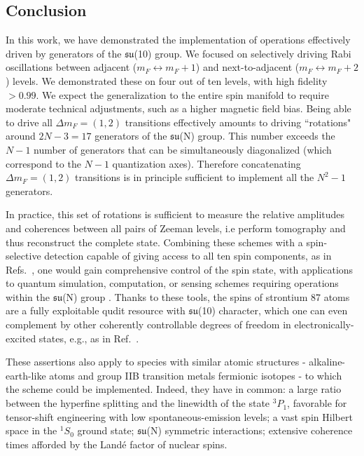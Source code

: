  
 
 \subsection{Conclusion}
 \label{Sec:Conclusion}

In this work, we have demonstrated the implementation of operations effectively driven by generators of the $\mathfrak{su}$(10) group. We focused on selectively driving Rabi oscillations between adjacent ($m_F \longleftrightarrow m_F+1$) and next-to-adjacent ($m_F \longleftrightarrow m_F+2$) levels. We demonstrated these on four out of ten levels, with high fidelity $>0.99$. We expect the generalization to the entire spin manifold to require moderate technical adjustments, such as a higher magnetic field bias. Being able to drive all $\Delta m_F = (1,2)$ transitions effectively amounts to driving ``rotations" around $2N-3 = 17$ generators of the $\mathfrak{su}$(N) group. This number exceeds the $N-1$ number of generators that can be simultaneously diagonalized (which  correspond to the $N-1$ quantization axes). Therefore concatenating $\Delta m_F = (1,2)$ transitions is in principle sufficient to implement all the $N^2-1$ generators. 

In practice, this set of rotations is sufficient to measure the relative amplitudes and coherences between all pairs of Zeeman levels, i.e perform tomography and thus reconstruct the complete state. Combining these schemes with a spin-selective detection capable of giving access to all ten spin components, as in Refs.~\cite{Stellmer2011dam, Taie2010roa}, one would gain comprehensive control of the spin state, with applications to quantum simulation, computation, or sensing schemes requiring operations within the $\mathfrak{su}$(N) group \cite{Kiktenko2015sqr, Omanakuttan2021, Godfrin2018gri, Randall2015epa, Lanyon2008sql}. Thanks to these tools, the spins of strontium 87 atoms are a fully exploitable qudit resource with $\mathfrak{su}$(10) character, which one can even complement by other coherently controllable degrees of freedom in electronically-excited states, e.g., as in Ref.~\cite{Pucher2024, Nakamura2024}.

These assertions also apply to species with similar atomic structures - alkaline-earth-like atoms and group IIB transition metals fermionic isotopes - to which the scheme could be implemented. Indeed, they have in common: a large ratio between the hyperfine splitting and the linewidth of the state $^3P_1$, favorable for tensor-shift engineering with low spontaneous-emission levels; a vast spin Hilbert space in the $^1S_0$ ground state; $\mathfrak{su}$(N) symmetric interactions; extensive coherence times afforded by the Land\'e factor of nuclear spins.


